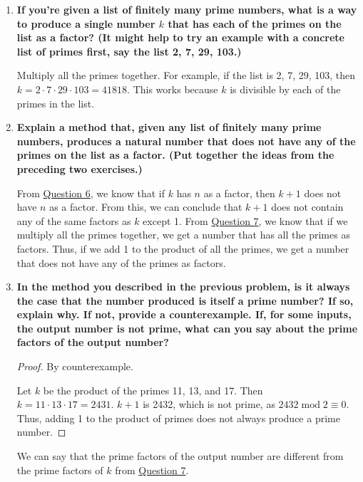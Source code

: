 \documentclass[article, 12pt]{article}
\theoremstyle{definition}
\newcommand{\Mod}[1]{\;\mathrm{mod}\; #1} %
\begin{document}
\begin{enumerate}[(1)]
\begin{proof}
            Therefore, $\forall k(P(k) \to \neg P(k+1))$, meaning if $k$ has $n$ as a factor, $k+1$ cannot have $n$ as a factor.
        \end{proof}
        \item \textbf{If you’re given a list of finitely many prime numbers, what is a way to produce a single number $k$ that has each of the primes on the list as a factor? (It might help to try an example with a concrete list of primes first, say the list 2, 7, 29, 103.)} \label{question:produce k}
        
        Multiply all the primes together. For example, if the list is 2, 7, 29, 103, then $k = 2 \cdot 7 \cdot 29 \cdot 103=41818$. This works because $k$ is divisible by each of the primes in the list.
        \item \textbf{Explain a method that, given any list of finitely many prime numbers, produces a natural number that does not have any of the primes on the list as a factor. (Put together the ideas from the preceding two exercises.)}
        
        From \hyperref[question:k + 1 cannot have n as a factor]{Question 6}, we know that if $k$ has $n$ as a factor, then $k+1$ does not have $n$ as a factor. From this, we can conclude that $k+1$ does not contain any of the same factors as $k$ except 1. From \hyperref[question:produce k]{Question 7}, we know that if we multiply all the primes together, we get a number that has all the primes as factors. Thus, if we add 1 to the product of all the primes, we get a number that does not have any of the primes as factors.

        \item \textbf{In the method you described in the previous problem, is it always the case that the number produced is itself a prime number? If so, explain why. If not, provide a counterexample. If, for some inputs, the output number is not prime, what can you say about the prime factors of the output number?}
        \begin{proof} By counterexample. 
            
            Let $k$ be the product of the primes 11, 13, and 17. Then $k = 11 \cdot 13 \cdot 17 = 2431$. $k+1$ is 2432, which is not prime, as $2432 \Mod{2} \equiv 0$. Thus, adding 1 to the product of primes does not always produce a prime number.  
        \end{proof}
        We can say that the prime factors of the output number are different from the prime factors of $k$ from \hyperref[question:produce k]{Question 7}.
    \end{enumerate}
\end{document}

